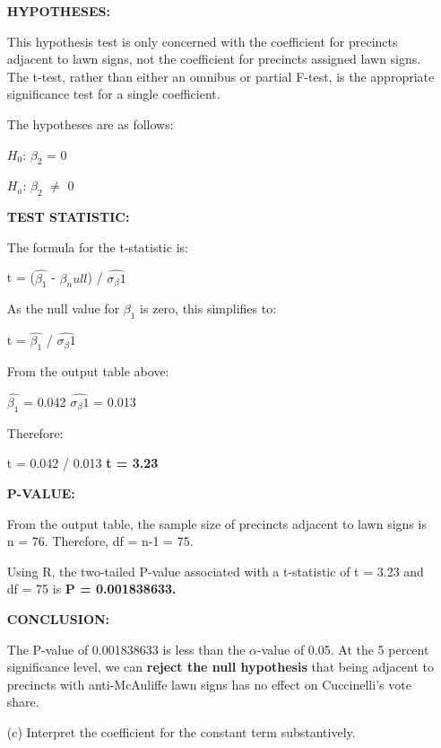 \documentclass[12pt,letterpaper]{article}
\begin{document}
\begin{enumerate}
	\textbf{HYPOTHESES:}
	
	This hypothesis test is only concerned with the coefficient for precincts adjacent to lawn signs, not the coefficient for precincts assigned lawn signs. The t-test, rather than either an omnibus or partial F-test, is the appropriate significance test for a single coefficient. 
	
	The hypotheses are as follows:
	
	$H_0$: $\beta_2$ = 0
	
	$H_a$: $\beta_2$ $\neq$ 0
	
	
	\vspace{.5cm}
	\textbf{TEST STATISTIC:} 
	
	The formula for the t-statistic is:
	
	t = ($\hat{\beta_1}$ - $\beta_null$) / $\hat{\sigma_\beta1}$
	
	As the null value for $\beta_1$ is zero, this simplifies to:
	
	t = $\hat{\beta_1}$ / $\hat{\sigma_\beta1}$
	
	From the output table above:
	
	$\hat{\beta_1}$ = 0.042
	$\hat{\sigma_\beta1}$ = 0.013
	
	Therefore:
	
	t = 0.042 / 0.013
\textbf{	t = 3.23}
	
		\vspace{2cm}
	\textbf{P-VALUE:}
	
	From the output table, the sample size of precincts adjacent to lawn signs is n = 76. Therefore, df = n-1 = 75. 
	
	 
	
	Using R, the two-tailed P-value associated with a t-statistic of t = 3.23 and df = 75 is \textbf{P = 0.001838633.}
	
		\vspace{.5cm}
	\textbf{CONCLUSION:}
	
	The P-value of 0.001838633 is less than the $\alpha$-value of 0.05. At the 5 percent significance level, we can \textbf{reject the null hypothesis} that being adjacent to precincts with anti-McAuliffe lawn signs has no effect on Cuccinelli's vote share. 
	
	\vspace{5cm}
	\item [(c)] Interpret the coefficient for the constant term substantively. \vspace{.5cm}
	

\end{enumerate}
\end{document}
